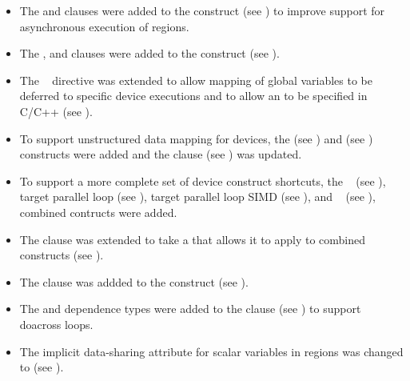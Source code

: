 \begin{itemize}
\item The  and  clauses were added to the 
       construct (see ) 
      to improve support for asynchronous execution of  regions. 

\item The ,  and  clauses 
      were added to the  construct (see ).

\item The ~ directive was extended to allow 
      mapping of global variables to be deferred to specific device 
      executions and to allow an 
      to be specified in C/C++ (see ).

\item To support unstructured data mapping for devices, the 
       (see ) and  (see ) constructs were added and the  clause 
      (see ) was updated.

\item To support a more complete set of device construct shortcuts, the
      ~ 
      (see ), 
      target parallel loop 
      (see ),
      target parallel loop SIMD 
      (see ),
      and ~ 
      (see ),
      combined contructs were added.

\item The  clause was extended to take a
       that allows it to apply
      to combined constructs (see ).

\item The  clause was addded to the  construct
      (see ).

\item The  and  dependence types were added to the 
       clause (see ) to support 
      doacross loops. 

\item The implicit data-sharing attribute for scalar variables in 
       regions was changed to  (see 
      ).
	 

\end{itemize}
